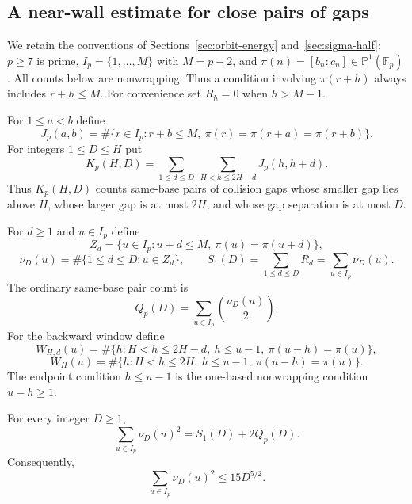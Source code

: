 
\subsection{A near-wall estimate for close pairs of gaps}
\label{sec:nw-near-wall}

We retain the conventions of Sections~\ref{sec:orbit-energy}
and~\ref{sec:sigma-half}: $p\ge7$ is prime,
$I_p=\{1,\ldots,M\}$ with $M=p-2$, and
$\pi(n)=[b_n:c_n]\in\mathbb P^1(\mathbb F_p)$.
All counts below are nonwrapping.  Thus a condition involving
$\pi(r+h)$ always includes $r+h\le M$.  For convenience set $R_h=0$
when $h>M-1$.

For $1\le a<b$ define
\[
 J_p(a,b)
 =\#\{r\in I_p:r+b\le M,
          \ \pi(r)=\pi(r+a)=\pi(r+b)\}.
\]
For integers $1\le D\le H$ put
\begin{equation}\label{eq:nw-K-def}
 K_p(H,D)
 =\sum_{1\le d\le D}\ \sum_{H<h\le2H-d}J_p(h,h+d).
\end{equation}
Thus $K_p(H,D)$ counts same-base pairs of collision gaps whose smaller
gap lies above $H$, whose larger gap is at most $2H$, and whose gap
separation is at most $D$.

For $d\ge1$ and $u\in I_p$ define
\[
 Z_d=\{u\in I_p:u+d\le M,\ \pi(u)=\pi(u+d)\},
\]
\[
 \nu_D(u)
 =\#\{1\le d\le D:u\in Z_d\},
 \qquad
 S_1(D)=\sum_{1\le d\le D}R_d=\sum_{u\in I_p}\nu_D(u).
\]
The ordinary same-base pair count is
\begin{equation}\label{eq:nw-Q-def}
 Q_p(D)=\sum_{u\in I_p}\binom{\nu_D(u)}2.
\end{equation}
For the backward window define
\[
 W_{H,d}(u)
 =\#\{h:H<h\le2H-d,\ h\le u-1,
          \ \pi(u-h)=\pi(u)\},
\]
\begin{equation}\label{eq:nw-W-def}
 W_H(u)
 =\#\{h:H<h\le2H,\ h\le u-1,
          \ \pi(u-h)=\pi(u)\}.
\end{equation}
The endpoint condition $h\le u-1$ is the one-based nonwrapping condition
$u-h\ge1$.

\begin{lemma}
\label{thm:nw-nu-identity}
For every integer $D\ge1$,
\begin{equation}\label{eq:nw-nu-identity}
 \sum_{u\in I_p}\nu_D(u)^2=S_1(D)+2Q_p(D).
\end{equation}
Consequently,
\begin{equation}\label{eq:nw-nu-L2}
 \sum_{u\in I_p}\nu_D(u)^2\le15D^{5/2}.
\end{equation}
\end{lemma}

